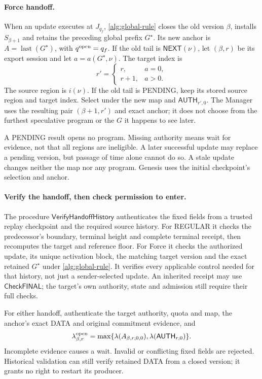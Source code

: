 \documentclass[11pt,a4paper]{article}
\newcommand{\tagg}[1]{\ensuremath{\mathsf{#1}}}
\begin{document}
\paragraph{Force handoff.}
\label{sec:retry-slot}
When an update executes at $J_{q_f}$, \cref{alg:global-rule} closes the
old version $\beta$, installs $S_{\beta+1}$ and retains the preceding
global prefix $G^\star$. Its new anchor is
$A=\operatorname{last}(G^\star)$, with $q^{\rm open}=q_f$.
If the old tail is $\tagg{NEXT}(\nu)$, let $(\beta,r)$ be its export
session and let $a=a(G^\star,\nu)$. The target index is
\[
 r'=\begin{cases}
 r,&a=0,\\
 r+1,&a>0.
 \end{cases}
\]
The source region is $i(\nu)$. If the old tail is PENDING, keep its
stored source region and target index. Select under the new map and
$\tagg{AUTH}_{r',0}$. The Manager uses the resulting pair
$(\beta+1,r')$ and exact anchor; it does not choose from the furthest
speculative program or the $G$ it happens to see later.

A PENDING result opens no program. Missing authority means wait for
evidence, not that all regions are ineligible. A later successful update
may replace a pending version, but passage of time alone cannot do so.
A stale update changes neither the map nor any program.
Genesis uses the initial checkpoint's selection and anchor.

\paragraph{Verify the handoff, then check permission to enter.}
\label{sec:verify-handoff}
The procedure $\tagg{VerifyHandoffHistory}$ authenticates the fixed
fields from a trusted replay checkpoint and the required source
history. For REGULAR it checks the predecessor's boundary, terminal
height and complete terminal receipt, then recomputes the target and
reference floor. For Force it checks the authorized update, its unique
activation block, the matching target version and the exact retained
$G^\star$ under \cref{alg:global-rule}. It verifies every applicable
control needed for that history, not just a sender-selected update.
An inherited receipt may use \tagg{CheckFINAL}; the target's own
authority, state and admission still require their full checks.

For either handoff, authenticate the target authority, quota and map,
the anchor's exact DATA and original commitment evidence, and
\[
 \lambda^{\rm open}_{\beta,r}
 =\max\{\lambda(A_{\beta,r,0,0}),
         \lambda(\tagg{AUTH}_{r,0})\}.
\]
Incomplete evidence causes a wait. Invalid or conflicting fixed fields
are rejected. Historical validation can still verify retained DATA
from a closed version; it grants no right to restart its producer.
\end{document}
